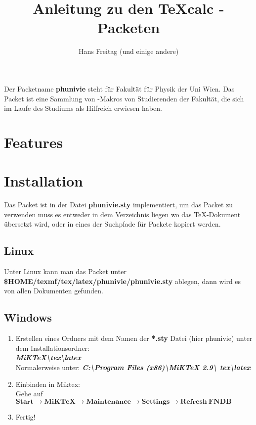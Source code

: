 \documentclass[a4paper]{article}
\begin{document}
\title{Anleitung zu den {\TeX}calc \LaTeXe-Packeten}
\author{Hans Freitag (und einige andere)}
\maketitle 


Der Packetname {\bf phunivie} steht für Fakultät für Physik der Uni Wien. 
Das Packet ist eine Sammlung von \LaTeXe-Makros von Studierenden der Fakultät, 
die sich im Laufe des Studiums als Hilfreich erwiesen haben. 

\tableofcontents

\section{Features}


\section{Installation}

Das Packet ist in der Datei {\bf phunivie.sty} implementiert, um das Packet zu 
verwenden muss es entweder in dem Verzeichnis liegen wo das \TeX-Dokument 
übersetzt wird, oder in eines der Suchpfade für Packete kopiert werden.\\

\subsection{Linux}

Unter Linux kann man das Packet unter  {\bf
\$HOME/texmf/tex/latex/phunivie/phunivie.sty} ablegen, dann wird es von allen 
Dokumenten gefunden. \\

\subsection{Windows}
\begin{enumerate}
	\item Erstellen eines Ordners mit dem Namen der \textbf{\textbf{*.sty}} 
		Datei (hier phunivie) unter dem Installationsordner:\\

		\textbf{\emph{MiKTeX\textbackslash tex\textbackslash latex}}\\
		Normalerweise unter: \textbf{\emph{C:\textbackslash Program 
		Files (x86)\textbackslash MiKTeX 2.9\textbackslash 
		tex\textbackslash latex}}

	\item Einbinden in Miktex:\\
			Gehe auf $\boldsymbol{Start \rightarrow MiKTeX \rightarrow 
			Maintenance \rightarrow Settings \rightarrow Refresh~FNDB}$

	\item Fertig!
\end{enumerate}
\end{document}
